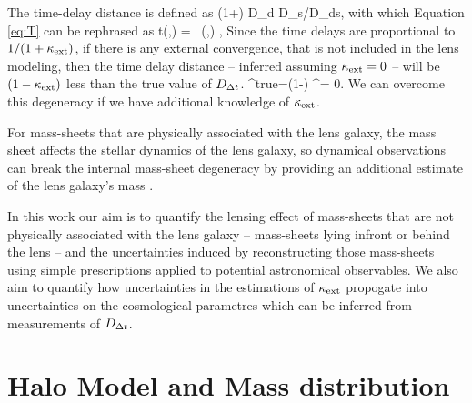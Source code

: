 \documentclass[useAMS,usenatbib]{mn2e}
\begin{document}

The time-delay distance is defined as
\be \label{eq:dt}
\Dt \equiv (1+\zd) D_{\rm d} D_{\rm s}/D_{\rm ds},
\ee
with which Equation \ref{eq:T} can be rephrased as
\be
\Delta t(\bmath{\theta},\bmath{\beta})  =   \, \phi(\bmath{\theta},\bmath{\beta})    ,
\ee 
Since the time delays are proportional to $1/ (1+ \kappa_{\rm ext})$, if there is any external convergence, that is not included in the lens
modeling, then the time delay distance -- inferred assuming $\kappa_{\rm ext} = 0$ -- will be
$(1-\kappa_{\rm ext})$ less than the true value of $D_{\Delta t}$.
\be 
\label{eq:MassSheet:H0bias}
\Dt^{\rm{true}}=(1-\kappax) \Dt^{{\kappax = 0}}.
\ee
We can overcome this degeneracy if we have additional knowledge of $\kappa_{\rm ext}$.

For mass-sheets that are physically associated with the lens galaxy, the mass sheet
 affects the stellar dynamics of the
lens galaxy, so dynamical observations can break the internal
mass-sheet degeneracy by providing an additional estimate of the lens galaxy's mass
\citep[e.g.,][]{citations}. 

In this work our aim is to quantify the lensing effect of mass-sheets that are not physically associated with the lens galaxy -- mass-sheets
lying infront or behind the lens -- and the uncertainties induced by reconstructing
those mass-sheets using simple prescriptions applied to potential astronomical observables.
We also aim to quantify how uncertainties in the
estimations of $\kappa_{\rm ext}$ propogate into uncertainties on the cosmological parametres
which can be inferred from measurements of $D_{\Delta t}$.



\section{Halo Model and Mass distribution}
\label{sec:model}

%
\end{document}
